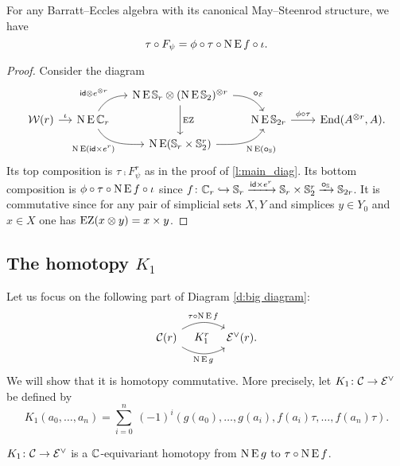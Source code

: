 \begin{lemma}\label{l:K0}
	For any Barratt--Eccles algebra with its canonical May--Steenrod structure, we have
	\[
	\tau \mathbin{\circ} F_\psi = \phi \mathbin{\circ} \tau \mathbin{\circ} \operatorname{N}\operatorname{E} f \mathbin{\circ} \iota.
	\]
\end{lemma}

\begin{proof}
	Consider the diagram
	\begin{equation*}\label{d:F and f}
		\begin{tikzcd}[column sep=small,row sep=tiny]
			&& \chains\EE\sym_r \ot (\chains\EE\sym_2)^{\ot r}
			\arrow[dr,"\bcomp_{\BE}",out=0,in=120]
			\arrow[dd,"\EZ"] &&[10pt] \\
			\cW(r) \arrow[r,"\iota"] &
			\chains\EE\cyc_r
			\arrow[ur,"\id \ot e^{\ot r}", out=60,in=180]
			\arrow[dr,"\chains\EE(\id \times e^r)"',out=-60,in=180]
			& & \chains\EE\sym_{2r} \arrow[r,"\phi\comp\tau"] &
			\End(A^{\ot r}, A). \\
			&& \chains\EE(\sym_r \times \sym_2^r)
			\arrow[ur, "\chains\EE(\bcomp_{\sym})"', out=0,in=-120]
			&
		\end{tikzcd}
	\end{equation*}
	Its top composition is $\tau \comp F_\psi^r$ as in the proof of \cref{l:main_diag}.
	Its bottom composition is $\phi \mathbin{\circ} \tau \mathbin{\circ} \operatorname{N}\operatorname{E} f \mathbin{\circ} \iota$ since $f \colon \mathbb{C}_r \hookrightarrow \mathbb{S}_r \xrightarrow{\mathsf{id} \times e^r} \mathbb{S}_r \times \mathbb{S}_2^r \xrightarrow{\bm{\mathbin{\circ}}_{\mathbb{S}}} \mathbb{S}_{2r}$.
	It is commutative since for any pair of simplicial sets $X,Y$ and simplices $y \in Y_0$ and $x \in X$ one has $\operatorname{EZ}(x \otimes y) = x \times y$.
\end{proof}

\subsection{The homotopy $K_1$}\label{ss:K1}

Let us focus on the following part of Diagram \eqref{d:big diagram}:
\[
\begin{tikzcd}[column sep=large]
	\cC(r)
	\arrow[r,bend left,"\tau \comp \chains\EE f"]
	\arrow[r,bend right,"\chains\EE g"']
	\arrow[r,phantom,"K_1^r"]
	& \BE^\vee(r).
\end{tikzcd}
\]
We will show that it is homotopy commutative.
More precisely, let $K_1 \colon \mathcal{C} \to \mathcal{E}^\vee$ be defined by
\[
K_1(a_0,\dots,a_n) =
\sum_{i=0}^n \ (-1)^i (g(a_0), \dots, g(a_i), f(a_i) \tau, \dots, f(a_n) \tau).
\]

\begin{lemma}\label{l:K1}
	$K_1 \colon \mathcal{C} \to \mathcal{E}^\vee$ is a $\mathbb{C}$-equivariant homotopy from $\operatorname{N} \operatorname{E} g$ to $\tau \mathbin{\circ} \operatorname{N} \operatorname{E} f$.
\end{lemma}


